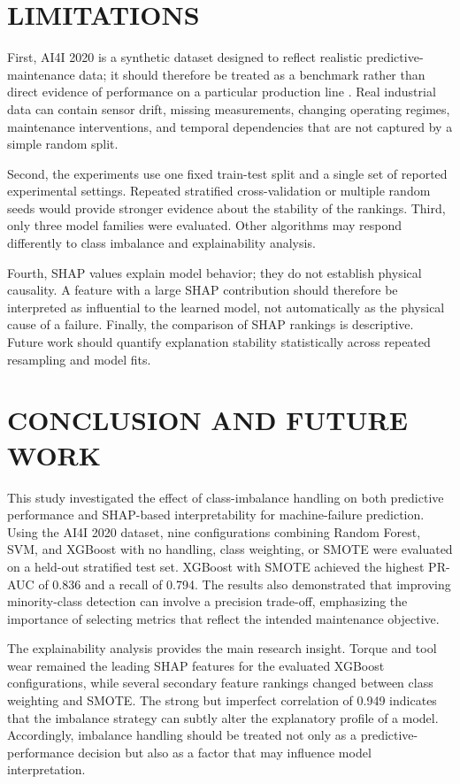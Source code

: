 \documentclass[conference]{IEEEtran}
\begin{document}
\section{LIMITATIONS}

First, AI4I 2020 is a synthetic dataset designed to reflect realistic predictive-maintenance data; it should therefore be treated as a benchmark rather than direct evidence of performance on a particular production line \cite{uci2020ai4i}. Real industrial data can contain sensor drift, missing measurements, changing operating regimes, maintenance interventions, and temporal dependencies that are not captured by a simple random split.

Second, the experiments use one fixed train-test split and a single set of reported experimental settings. Repeated stratified cross-validation or multiple random seeds would provide stronger evidence about the stability of the rankings. Third, only three model families were evaluated. Other algorithms may respond differently to class imbalance and explainability analysis.

Fourth, SHAP values explain model behavior; they do not establish physical causality. A feature with a large SHAP contribution should therefore be interpreted as influential to the learned model, not automatically as the physical cause of a failure. Finally, the comparison of SHAP rankings is descriptive. Future work should quantify explanation stability statistically across repeated resampling and model fits.

\section{CONCLUSION AND FUTURE WORK}

This study investigated the effect of class-imbalance handling on both predictive performance and SHAP-based interpretability for machine-failure prediction. Using the AI4I 2020 dataset, nine configurations combining Random Forest, SVM, and XGBoost with no handling, class weighting, or SMOTE were evaluated on a held-out stratified test set. XGBoost with SMOTE achieved the highest PR-AUC of 0.836 and a recall of 0.794. The results also demonstrated that improving minority-class detection can involve a precision trade-off, emphasizing the importance of selecting metrics that reflect the intended maintenance objective.

The explainability analysis provides the main research insight. Torque and tool wear remained the leading SHAP features for the evaluated XGBoost configurations, while several secondary feature rankings changed between class weighting and SMOTE. The strong but imperfect correlation of 0.949 indicates that the imbalance strategy can subtly alter the explanatory profile of a model. Accordingly, imbalance handling should be treated not only as a predictive-performance decision but also as a factor that may influence model interpretation.
\end{document}
